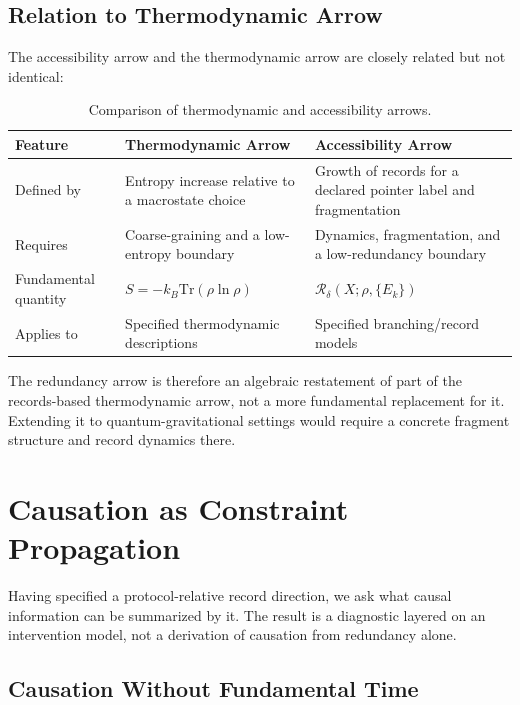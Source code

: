 \documentclass[12pt,a4paper]{article}
\begin{document}
\subsection{Relation to Thermodynamic Arrow}

The accessibility arrow and the thermodynamic arrow are closely related but not identical:

\begin{table}[ht]
\centering
\small
\begin{tabular}{|P{3.5cm}|P{4.5cm}|P{4.5cm}|}
\hline
\textbf{Feature} & \textbf{Thermodynamic Arrow} & \textbf{Accessibility Arrow} \\
\hline
Defined by & Entropy increase relative to a macrostate choice & Growth of records for a declared pointer label and fragmentation \\
\hline
Requires & Coarse-graining and a low-entropy boundary & Dynamics, fragmentation, and a low-redundancy boundary \\
\hline
Fundamental quantity & $S = -k_B \text{Tr}(\rho \ln \rho)$ & $\mathcal{R}_\delta(X;\rho,\{E_k\})$ \\
\hline
Applies to & Specified thermodynamic descriptions & Specified branching/record models \\
\hline
\end{tabular}
\caption{Comparison of thermodynamic and accessibility arrows.}
\label{tab:arrows}
\end{table}

The redundancy arrow is therefore an algebraic restatement of part of the records-based thermodynamic arrow, not a more fundamental replacement for it.  Extending it to quantum-gravitational settings would require a concrete fragment structure and record dynamics there.

\section{Causation as Constraint Propagation}
\label{sec:causation}

Having specified a protocol-relative record direction, we ask what causal information can be summarized by it.  The result is a diagnostic layered on an intervention model, not a derivation of causation from redundancy alone.

\subsection{Causation Without Fundamental Time}
\end{document}

